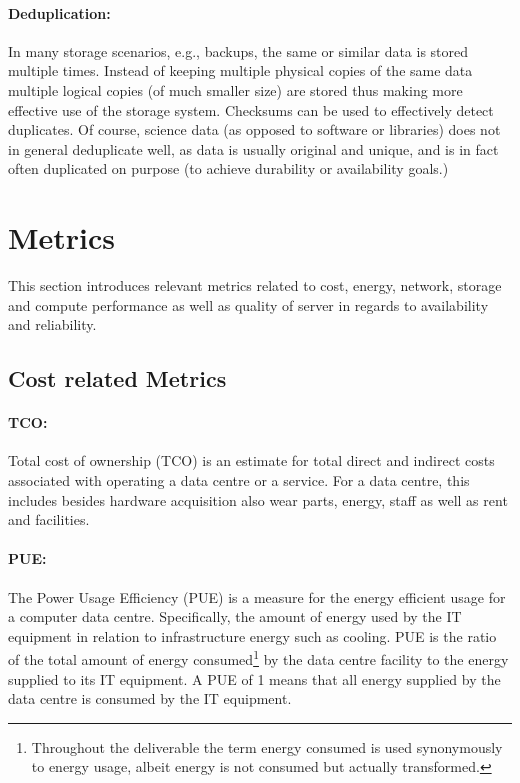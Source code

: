 \paragraph{Deduplication:}
In many storage scenarios, e.g., backups, the same or similar data is stored multiple times.
Instead of keeping multiple physical copies of the same data multiple logical copies (of much smaller size) are stored
thus making more effective use of the storage system.
Checksums can be used to effectively detect duplicates.
Of course, science data (as opposed to software or libraries) does not in general deduplicate well, as data is usually
original and unique, and is in fact often duplicated on purpose (to achieve durability or availability goals.)


\section{Metrics}

This section introduces relevant metrics related to cost, energy, network, storage and compute performance as well as  quality of server in regards to availability and reliability.

\subsection{Cost related Metrics}

\paragraph{TCO:}
Total cost of ownership (TCO) is an estimate for total direct and indirect costs associated with operating a data centre or a service.
For a data centre, this includes besides hardware acquisition also wear parts, energy, staff as well as rent and facilities.


\paragraph{PUE:}
The Power Usage Efficiency (PUE) is a measure for the energy efficient usage for a computer data centre. Specifically, the amount of energy used by the IT equipment in relation to infrastructure energy such as cooling.
PUE is the ratio of the total amount of energy consumed\footnote{Throughout the deliverable the term energy consumed is used synonymously to energy usage, albeit energy is not consumed but actually transformed.}  by the data centre facility to the energy supplied to its IT equipment.
A PUE of 1 means that all energy supplied by the data centre is consumed by the IT equipment.


